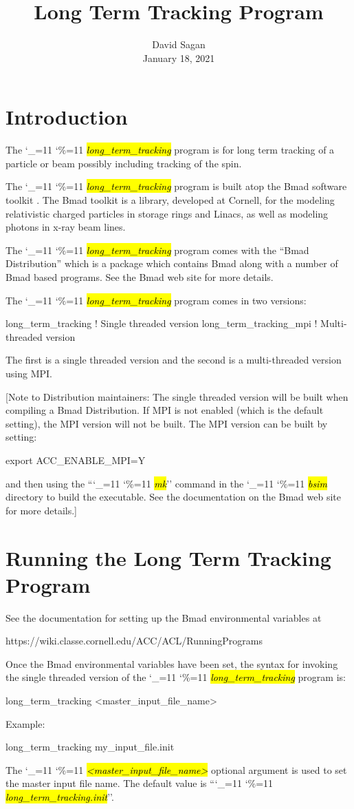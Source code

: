 \documentclass{hitec}
\title{Long Term Tracking Program}
\author{}
\date{David Sagan \\ January 18, 2021}
\newcommand\dottcmd[1]{\hl{\em#1}\endgroup}
\newcommand{\vn}{\begingroup\catcode`\_=11 \catcode`\%=11 \dottcmd}
\newcommand{\ltt}{\vn{long_term_tracking}\xspace}
\newcommand{\Section}[1]{\section{#1}\vspace*{-1ex}}
\begin{document}
\maketitle

\tableofcontents


\Section{Introduction} 
\label{s:intro}

The \ltt program is for long term tracking of a particle or beam possibly including tracking of the
spin.

The \ltt program is built atop the Bmad software toolkit \cite{b:bmad}. The Bmad toolkit is a
library, developed at Cornell, for the modeling relativistic charged particles in storage rings and
Linacs, as well as modeling photons in x-ray beam lines.

The \ltt program comes with the ``Bmad Distribution'' which is a package which contains Bmad along with
a number of Bmad based programs. See the Bmad web site for more details.

The \ltt program comes in two versions: 
\begin{code}
long_term_tracking      ! Single threaded version
long_term_tracking_mpi  ! Multi-threaded version
\end{code}
The first is a single threaded version and the second is a multi-threaded version using MPI.

[Note to Distribution maintainers: The single threaded version will be built when compiling a Bmad
Distribution. If MPI is not enabled (which is the default setting), the MPI version will not be built. 
The MPI version can be built by setting:
\begin{code}
  export ACC_ENABLE_MPI=Y
\end{code}
and then using the ``\vn{mk}'' command in the \vn{bsim} directory to build the executable. See the
documentation on the Bmad web site for more details.]

\Section{Running the Long Term Tracking Program} 
\label{s:run}

See the documentation for setting up the Bmad environmental variables at
\begin{code}
  https://wiki.classe.cornell.edu/ACC/ACL/RunningPrograms
\end{code}

Once the Bmad environmental variables have been set, the syntax for invoking the single threaded
version of the \ltt program is:
\begin{code}
  long_term_tracking {<master_input_file_name>}
\end{code}
Example:
\begin{code}
  long_term_tracking my_input_file.init
\end{code}
The \vn{<master_input_file_name>} optional argument is used to set the master input file name. The
default value is ``\vn{long_term_tracking.init}''. 
\end{document}
